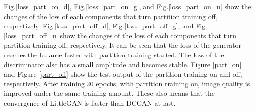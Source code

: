 Fig.\ref{loss_part_on_d}, Fig.\ref{loss_part_on_g}, and Fig.\ref{loss_part_on_u} show the changes of the loss of each components that turn partition training off, respectively.
Fig.\ref{loss_part_off_d}, Fig.\ref{loss_part_off_g}, and Fig.\ref{loss_part_off_u} show the changes of the loss of each components that turn partition training off, respectively.
It can be seen that the loss of the generator reaches the balance faster with partition training started.
 The loss of the discriminator also has a small amplitude and becomes stable.
Figure \ref{part_on} and Figure \ref{part_off} show the test output of the partition training on and off, respectively.
After training 20 epochs, with partition training on, image quality is improved under the same training amount.
These also means that the convergence of LittleGAN is faster than DCGAN at last.

